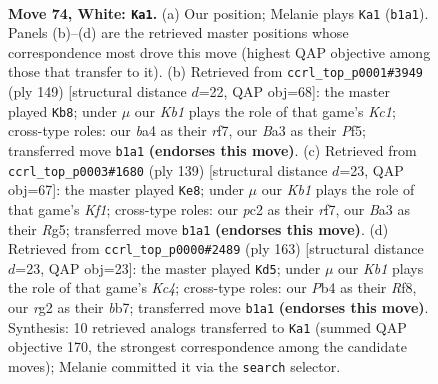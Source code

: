 \documentclass[11pt]{article}
\begin{document}
\clearpage

\begin{figure}[p]\centering
\begin{subfigure}{0.46\textwidth}\centering
\resizebox{\linewidth}{!}{%
\newchessgame
\chessboard[
  setfen={6k1/8/R7/8/bP6/B7/2p3r1/1K6 w - - 0 74},
  showmover=false,
  pgfstyle=straightmove, color=movearrow, markmove={b1-a1}
]}
\caption{}
\end{subfigure}\hfill
\begin{subfigure}{0.46\textwidth}\centering
\resizebox{\linewidth}{!}{%
\newchessgame
\chessboard[
  setfen={2k5/1P3R2/8/4rp1p/8/8/8/2K5 b - - 0 75},
  showmover=false,
  pgfstyle=straightmove, color=movearrow, markmove={c8-b8}
]}
\caption{}
\end{subfigure}
\\[4pt]
\begin{subfigure}{0.46\textwidth}\centering
\resizebox{\linewidth}{!}{%
\newchessgame
\chessboard[
  setfen={5k2/5R2/8/6r1/8/pB3K2/Pb6/8 b - - 17 70},
  showmover=false,
  pgfstyle=straightmove, color=movearrow, markmove={f8-e8}
]}
\caption{}
\end{subfigure}\hfill
\begin{subfigure}{0.46\textwidth}\centering
\resizebox{\linewidth}{!}{%
\newchessgame
\chessboard[
  setfen={5r2/1Bb5/2P5/2k5/8/4K1p1/2R5/8 b - - 9 82},
  showmover=false,
  pgfstyle=straightmove, color=movearrow, markmove={c5-d5}
]}
\caption{}
\end{subfigure}
\caption{\textbf{Move 74, White: \texttt{Ka1}.} (a) Our position; Melanie plays \texttt{Ka1} (\texttt{b1a1}). Panels (b)--(d) are the retrieved master positions whose correspondence most drove this move (highest QAP objective among those that transfer to it). (b) Retrieved from \texttt{ccrl\_top\_p0001\#3949} (ply 149) [structural distance $d$=22, QAP obj=68]: the master played \texttt{Kb8}; under $\mu$ our \emph{Kb1} plays the role of that game's \emph{Kc1}; cross-type roles: our \emph{b}a4 as their \emph{r}f7, our \emph{B}a3 as their \emph{P}f5; transferred move \texttt{b1a1} \textbf{(endorses this move)}. (c) Retrieved from \texttt{ccrl\_top\_p0003\#1680} (ply 139) [structural distance $d$=23, QAP obj=67]: the master played \texttt{Ke8}; under $\mu$ our \emph{Kb1} plays the role of that game's \emph{Kf1}; cross-type roles: our \emph{p}c2 as their \emph{r}f7, our \emph{B}a3 as their \emph{R}g5; transferred move \texttt{b1a1} \textbf{(endorses this move)}. (d) Retrieved from \texttt{ccrl\_top\_p0000\#2489} (ply 163) [structural distance $d$=23, QAP obj=23]: the master played \texttt{Kd5}; under $\mu$ our \emph{Kb1} plays the role of that game's \emph{Kc4}; cross-type roles: our \emph{P}b4 as their \emph{R}f8, our \emph{r}g2 as their \emph{b}b7; transferred move \texttt{b1a1} \textbf{(endorses this move)}. Synthesis: 10 retrieved analogs transferred to \texttt{Ka1} (summed QAP objective 170, the strongest correspondence among the candidate moves); Melanie committed it via the \texttt{search} selector.}
\label{fig:thought-m146}
\end{figure}
\end{document}
